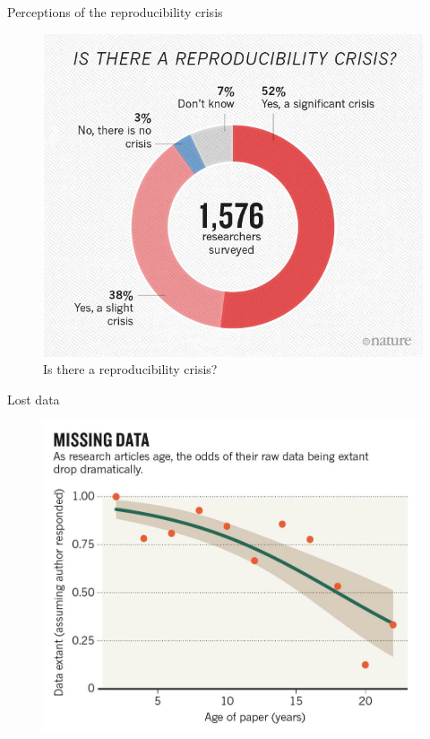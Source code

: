 \documentclass[aspectratio=169, 11pt]{beamer} %
\begin{document}
\begin{frame}{Perceptions of the reproducibility crisis}
  \begin{figure}[H]
    \centering
        \includegraphics[height=.7\textheight]{figures/reproducibility-graphic-online1.jpeg}
        \caption{Is there a reproducibility crisis? \cite{Baker2016-cf}}
        \label{fig:Baker2016}
  \end{figure}
\end{frame}

\begin{frame}{Lost data}
 \begin{figure}[H]
    \centering
        \includegraphics[height=.75\textheight]{figures/Missing-Data.png}
        \caption{\cite{Vines2014-zr}}
        \label{fig:vines2014}
 \end{figure}
\end{frame}
\end{document}
